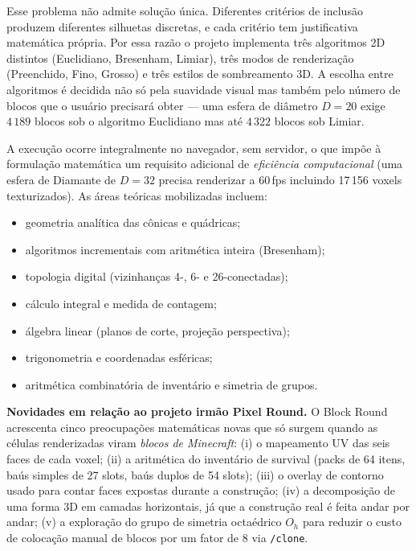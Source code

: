 \documentclass[12pt,a4paper]{scrartcl}
\newcommand{\cmd}[1]{\textcolor{earth}{\texttt{\small #1}}}
\begin{document}
Esse problema não admite solução única. Diferentes critérios de inclusão produzem diferentes silhuetas discretas, e cada critério tem justificativa matemática própria. Por essa razão o projeto implementa três algoritmos 2D distintos (Euclidiano, Bresenham, Limiar), três modos de renderização (Preenchido, Fino, Grosso) e três estilos de sombreamento 3D. A escolha entre algoritmos é decidida não só pela suavidade visual mas também pelo número de blocos que o usuário precisará obter --- uma esfera de diâmetro $D=20$ exige $4\,189$ blocos sob o algoritmo Euclidiano mas até $4\,322$ blocos sob Limiar.

A execução ocorre integralmente no navegador, sem servidor, o que impõe à formulação matemática um requisito adicional de \emph{eficiência computacional} (uma esfera de Diamante de $D=32$ precisa renderizar a 60\,fps incluindo 17\,156 voxels texturizados). As áreas teóricas mobilizadas incluem:
\begin{itemize}[leftmargin=1.3em,itemsep=0.15em,topsep=0.3em]
  \item geometria analítica das cônicas e quádricas;
  \item algoritmos incrementais com aritmética inteira (Bresenham);
  \item topologia digital (vizinhanças 4-, 6- e 26-conectadas);
  \item cálculo integral e medida de contagem;
  \item álgebra linear (planos de corte, projeção perspectiva);
  \item trigonometria e coordenadas esféricas;
  \item aritmética combinatória de inventário e simetria de grupos.
\end{itemize}

\textbf{Novidades em relação ao projeto irmão Pixel Round.} O Block Round acrescenta cinco preocupações matemáticas novas que só surgem quando as células renderizadas viram \emph{blocos de Minecraft}: (i) o mapeamento UV das seis faces de cada voxel; (ii) a aritmética do inventário de survival (packs de 64 itens, baús simples de 27 slots, baús duplos de 54 slots); (iii) o overlay de contorno usado para contar faces expostas durante a construção; (iv) a decomposição de uma forma 3D em camadas horizontais, já que a construção real é feita andar por andar; (v) a exploração do grupo de simetria octaédrico $O_h$ para reduzir o custo de colocação manual de blocos por um fator de $8$ via \cmd{/clone}.

\end{document}
